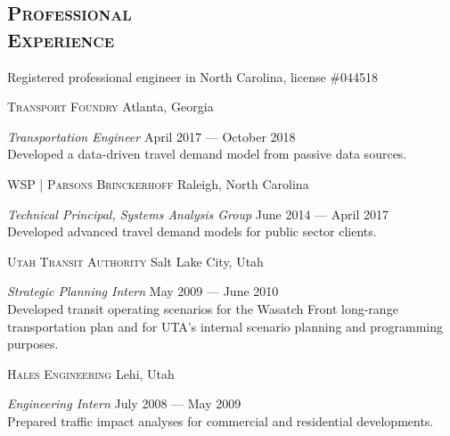 \documentclass[margin,line]{res}
\newcommand{\secfont}{\scshape }
\newcommand{\acc}{\scshape }
\begin{document}
\begin{resume}
\noindent\makebox[\linewidth]{\rule{\linewidth}{0.4pt}}

\section{\secfont Professional \\ Experience}

Registered professional engineer in North Carolina, license \#044518

{\acc Transport Foundry} Atlanta, Georgia

\vspace{-.3cm}
\textit{Transportation Engineer} \hfill {April 2017 --- October 2018}\\
Developed a data-driven travel demand model from passive data sources.

{\acc WSP | Parsons Brinckerhoff} Raleigh, North Carolina

\vspace{-.3cm}
\textit{Technical Principal, Systems Analysis Group} \hfill {June 2014 --- April 2017}\\
Developed advanced travel demand models for public sector clients.



{\acc Utah Transit Authority} Salt Lake City, Utah

\vspace{-.3cm}
\textit{Strategic Planning Intern} \hfill {May 2009 --- June 2010}\\
Developed transit operating scenarios for the Wasatch Front long-range
transportation plan and for UTA's internal scenario planning and programming purposes.

{\acc Hales Engineering} Lehi, Utah

\vspace{-.3cm}
\textit{Engineering Intern} \hfill {July 2008 --- May 2009}\\
Prepared traffic impact analyses for commercial and residential developments.





\end{resume}
\end{document}
